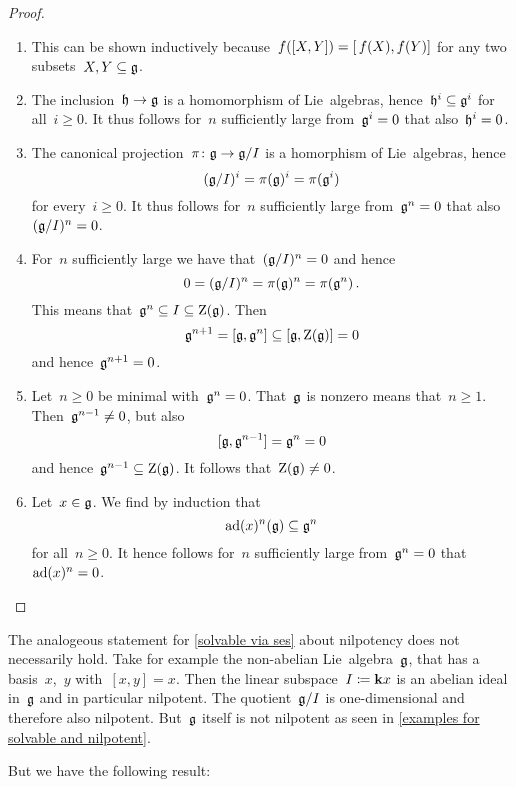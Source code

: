 \begin{proof}
  \leavevmode
  \begin{enumerate}
    \item
      This can be shown inductively because~$f([X,Y]) = [\, f(X), f(Y)]$ for any two subsets~$X, Y \subseteq \mathfrak{g}$.
    \item
      The inclusion~$\mathfrak{h} \to \mathfrak{g}$ is a homomorphism of Lie~algebras, hence~$\mathfrak{h}^i \subseteq \mathfrak{g}^i$ for all~$i \geq 0$.
      It thus follows for~$n$ sufficiently large from~$\mathfrak{g}^i = 0$ that also~$\mathfrak{h}^i = 0$.
    \item
      The canonical projection~$\pi \colon \mathfrak{g} \to \mathfrak{g}/I$ is a homorphism of Lie~algebras, hence
      \[
        (\mathfrak{g}/I)^i
        =
        \pi(\mathfrak{g})^i
        =
        \pi(\mathfrak{g}^i)
      \]
      for every~$i \geq 0$.
      It thus follows for~$n$ sufficiently large from~$\mathfrak{g}^n = 0$ that also~$(\mathfrak{g}/I)^n = 0$.
    \item
      For~$n$ sufficiently large we have that~$(\mathfrak{g}/I)^n = 0$ and hence
      \[
        0
        =
        (\mathfrak{g}/I)^n
        =
        \pi(\mathfrak{g})^n
        =
        \pi(\mathfrak{g}^n)  \,.
      \]
      This means that~$\mathfrak{g}^n \subseteq I \subseteq \operatorname{Z}(\mathfrak{g})$.
      Then
      \[
        \mathfrak{g}^{n+1}
        =
        [\mathfrak{g}, \mathfrak{g}^n]
        \subseteq
        [\mathfrak{g}, \operatorname{Z}(\mathfrak{g})]
        =
        0
      \]
      and hence~$\mathfrak{g}^{n+1} = 0$.
    \item
      Let~$n \geq 0$ be minimal with~$\mathfrak{g}^n = 0$.
      That~$\mathfrak{g}$ is nonzero means that~$n \geq 1$.
      Then~$\mathfrak{g}^{n-1} \neq 0$, but also
      \[
        [\mathfrak{g}, \mathfrak{g}^{n-1}]
        =
        \mathfrak{g}^n
        =
        0
      \]
      and hence~$\mathfrak{g}^{n-1} \subseteq \operatorname{Z}(\mathfrak{g})$.
      It follows that~$\operatorname{Z}(\mathfrak{g}) \neq 0$.
    \item
      Let~$x \in \mathfrak{g}$.
      We find by induction that
      \[
        \operatorname{ad}(x)^n(\mathfrak{g})
        \subseteq
        \mathfrak{g}^n
      \]
      for all~$n \geq 0$.
      It hence follows for~$n$ sufficiently large from~$\mathfrak{g}^n = 0$ that~$\operatorname{ad}(x)^n = 0$.
    \qedhere
  \end{enumerate}
\end{proof}


\begin{remark}
  The analogeous statement for \cref{solvable via ses} about nilpotency does not necessarily hold.
  Take for example the {\twodimensional} non-abelian Lie~algebra~$\mathfrak{g}$, that has a basis~$x$,~$y$ with~$[x,y] = x$.
  Then the {\onedimensional} linear subspace~$I \coloneqq \mathbf{k} x$ is an abelian ideal in~$\mathfrak{g}$ and in particular nilpotent.
  The quotient~$\mathfrak{g}/I$ is one-dimensional and therefore also nilpotent.
  But~$\mathfrak{g}$ itself is not nilpotent as seen in \cref{examples for solvable and nilpotent}.
  
  But we have the following result:
\end{remark}


